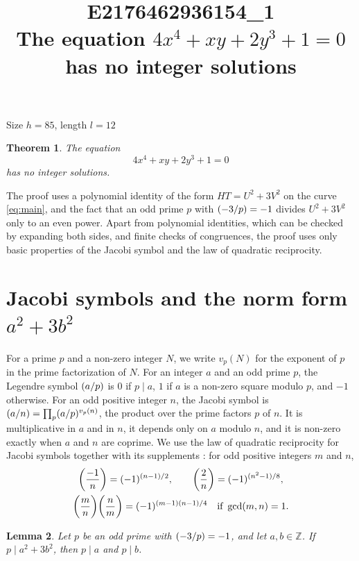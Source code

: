 \documentclass[11pt]{article}
\title{\textbf{E2176462936154\_1}\\[4pt] {\Large The equation $4x^{4}+xy+2y^{3}+1=0$ has no integer solutions}}
\author{}
\date{}
\newtheorem{theorem}{Theorem}
\newtheorem{lemma}[theorem]{Lemma}
\newcommand{\Z}{\mathbb{Z}}
\newcommand{\leg}[2]{\mathchoice{\biggl(\dfrac{#1}{#2}\biggr)}{(#1/#2)}{(#1/#2)}{(#1/#2)}}
\begin{document}
\maketitle
\vspace{-8ex}
\begin{center}
Size $h=85$, length $l=12$
\end{center}

\begin{theorem}\label{thm:main}
The equation
\begin{equation}\label{eq:main}
4x^{4}+xy+2y^{3}+1=0
\end{equation}
has no integer solutions.
\end{theorem}

The proof uses a polynomial identity of the form $HT=U^2+3V^2$ on the curve \eqref{eq:main}, and the fact that an odd prime $p$ with $\leg{-3}{p}=-1$ divides $U^2+3V^2$ only to an even power. Apart from polynomial identities, which can be checked by expanding both sides, and finite checks of congruences, the proof uses only basic properties of the Jacobi symbol and the law of quadratic reciprocity.

\section{\texorpdfstring{Jacobi symbols and the norm form $a^2+3b^2$}{Jacobi symbols and the norm form}}

For a prime $p$ and a non-zero integer $N$, we write $v_p(N)$ for the exponent of $p$ in the prime factorization of $N$. For an integer $a$ and an odd prime $p$, the Legendre symbol $\leg{a}{p}$ is $0$ if $p\mid a$, $1$ if $a$ is a non-zero square modulo $p$, and $-1$ otherwise. For an odd positive integer $n$, the Jacobi symbol is $\leg{a}{n}=\prod_p\leg{a}{p}^{v_p(n)}$, the product over the prime factors $p$ of $n$. It is multiplicative in $a$ and in $n$, it depends only on $a$ modulo $n$, and it is non-zero exactly when $a$ and $n$ are coprime. We use the law of quadratic reciprocity for Jacobi symbols together with its supplements \cite[Chapter~5, \S2]{IR}: for odd positive integers $m$ and $n$,
\begin{gather*}
\leg{-1}{n}=(-1)^{(n-1)/2},\qquad\leg{2}{n}=(-1)^{(n^2-1)/8},\\
\leg{m}{n}\leg{n}{m}=(-1)^{(m-1)(n-1)/4}\quad\text{if }\gcd(m,n)=1.
\end{gather*}

\begin{lemma}\label{lem:divides}
Let $p$ be an odd prime with $\leg{-3}{p}=-1$, and let $a,b\in\Z$. If $p\mid a^2+3b^2$, then $p\mid a$ and $p\mid b$.
\end{lemma}
\end{document}

